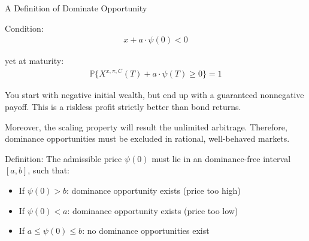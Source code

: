 \documentclass{beamer}
\begin{document}
\begin{frame}{A Definition of Dominate Opportunity}

    {\footnotesize \footnotesize
    \par Condition:
    \begin{align*}
         x + a \cdot \psi(0) < 0
    \end{align*}
    \par yet at maturity:
    \begin{align*}
        \mathbb{P}\{X^{x,\pi,C}(T) + a \cdot \psi(T) \geq 0\} = 1
    \end{align*}
    \par You start with negative initial wealth, but end up with a guaranteed nonnegative payoff. 
    This is a riskless profit strictly better than bond returns. 
    \vspace{1em}
    \par  \pause Moreover, 
    the scaling property will result the unlimited arbitrage.
     Therefore, dominance opportunities must be excluded in rational, well-behaved markets.
     \vspace{1em}
    \par Definition: The admissible price $\psi(0)$ must lie in an dominance-free interval $[a, b]$, such that:
    \begin{itemize}
        \item If $\psi(0) > b$: dominance opportunity exists (price too high)
        \item If $\psi(0) < a$: dominance opportunity exists (price too low)
        \item If $a \leq \psi(0) \leq b$: no dominance opportunities exist
    \end{itemize}
    }
\end{frame} 
\end{document}
